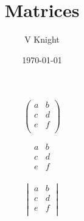 \documentclass{article}
\title{Matrices}
\author{V Knight}
\date{\today}
\begin{document}
\maketitle

\[
    \begin{pmatrix}
        a&b\\
        c&d\\
        e&f\\
    \end{pmatrix}
\]

\[
    \begin{matrix}
        a&b\\
        c&d\\
        e&f\\
    \end{matrix}
\]

\[
    \begin{vmatrix}
        a&b\\
        c&d\\
        e&f\\
    \end{vmatrix}
\]
\end{document}
